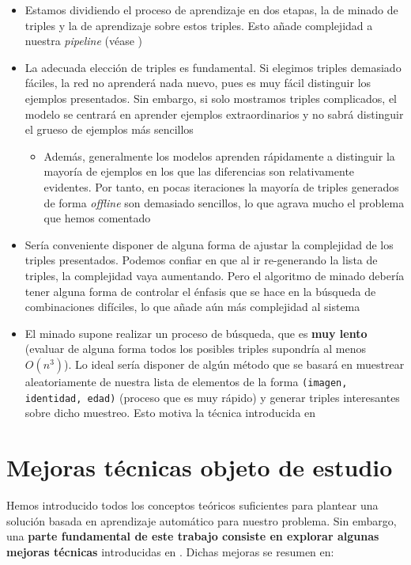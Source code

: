 \begin{itemize}
    \item Estamos dividiendo el proceso de aprendizaje en dos etapas, la de minado de triples y la de aprendizaje sobre estos triples. Esto añade complejidad a nuestra \textit{pipeline} (véase )
    \item La adecuada elección de triples es fundamental. Si elegimos triples demasiado fáciles, la red no aprenderá nada nuevo, pues es muy fácil distinguir los ejemplos presentados. Sin embargo, si solo mostramos triples complicados, el modelo se centrará en aprender ejemplos extraordinarios y no sabrá distinguir el grueso de ejemplos más sencillos
        \begin{itemize}
            \item Además, generalmente los modelos aprenden rápidamente a distinguir la mayoría de ejemplos en los que las diferencias son relativamente evidentes. Por tanto, en pocas iteraciones la mayoría de triples generados de forma \textit{offline} son demasiado sencillos, lo que agrava mucho el problema que hemos comentado
        \end{itemize}
    \item Sería conveniente disponer de alguna forma de ajustar la complejidad de los triples presentados. Podemos confiar en que al ir re-generando la lista de triples, la complejidad vaya aumentando. Pero el algoritmo de minado debería tener alguna forma de controlar el énfasis que se hace en la búsqueda de combinaciones difíciles, lo que añade aún más complejidad al sistema
    \item El minado supone realizar un proceso de búsqueda, que es \textbf{muy lento} (evaluar de alguna forma todos los posibles triples supondría al menos $O(n^3)$). Lo ideal sería disponer de algún método que se basará en muestrear aleatoriamente de nuestra lista de elementos de la forma \lstinline{(imagen, identidad, edad)} (proceso que es muy rápido) y generar triples interesantes sobre dicho muestreo. Esto motiva la técnica introducida en 
\end{itemize}

\section{Mejoras técnicas objeto de estudio}

Hemos introducido todos los conceptos teóricos suficientes para plantear una solución basada en aprendizaje automático para nuestro problema. Sin embargo, una \textbf{parte fundamental de este trabajo consiste en explorar algunas mejoras técnicas} introducidas en \cite{informatica:principal}. Dichas mejoras se resumen en:

